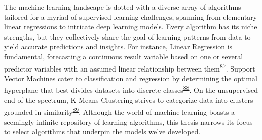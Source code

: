 \documentclass[
  10pt,
]{scrbook}
\begin{document}
The machine learning landscape is dotted with a diverse array of
algorithms tailored for a myriad of supervised learning challenges,
spanning from elementary linear regressions to intricate deep learning
models. Every algorithm has its niche strengths, but they collectively
share the goal of learning patterns from data to yield accurate
predictions and insights. For instance, Linear Regression is
fundamental, forecasting a continuous result variable based on one or
several predictor variables with an assumed linear relationship between
them\textsuperscript{\protect\hyperlink{ref-kutner_2005}{87}}. Support
Vector Machines cater to classification and regression by determining
the optimal hyperplane that best divides datasets into discrete
classes\textsuperscript{\protect\hyperlink{ref-cortes_1995}{88}}. On the
unsupervised end of the spectrum, K-Means Clustering strives to
categorize data into clusters grounded in
similarity\textsuperscript{\protect\hyperlink{ref-macqueen_1967}{89}}.
Although the world of machine learning boasts a seemingly infinite
repository of learning algorithms, this thesis narrows its focus to
select algorithms that underpin the models we've developed.
\end{document}
